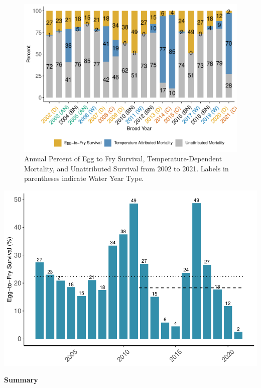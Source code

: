 \documentclass[
]{book}
\theoremstyle{definition}
\theoremstyle{definition}
\theoremstyle{definition}
\theoremstyle{definition}
\theoremstyle{remark}
\begin{document}
\begin{figure}
\centering
\includegraphics{_main_files/figure-latex/TDM-etf-fig-1.pdf}
\caption{\label{fig:TDM-etf-fig}Annual Percent of Egg to Fry Survival, Temperature-Dependent Mortality, and Unattributed Survival from 2002 to 2021. Labels in parentheses indicate Water Year Type.}
\end{figure}

\includegraphics{_main_files/figure-latex/ETFSurv-fig-1.pdf}

\textbf{Summary}
\end{document}
